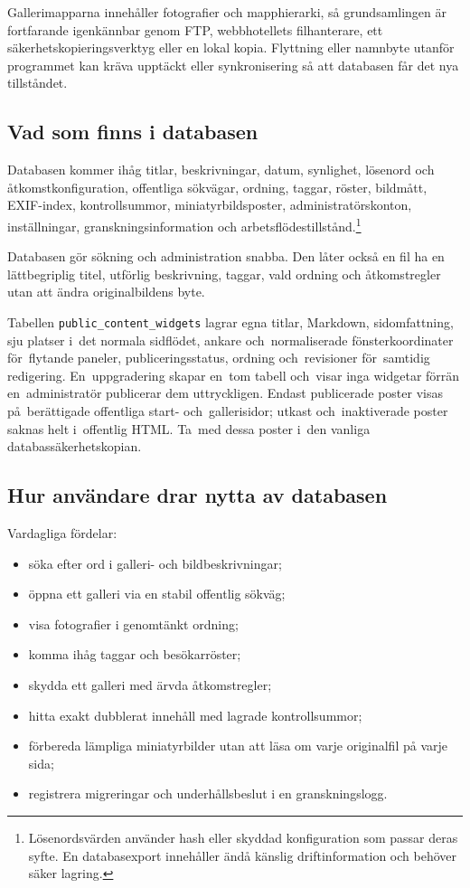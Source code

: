 \documentclass[11pt,a4paper]{article}
\begin{document}
Gallerimapparna innehåller fotografier och mapphierarki, så grundsamlingen är
fortfarande igenkännbar genom FTP, webbhotellets filhanterare, ett
säkerhetskopieringsverktyg eller en lokal kopia. Flyttning eller namnbyte
utanför programmet kan kräva upptäckt eller synkronisering så att databasen får
det nya tillståndet.

\subsection{Vad som finns i databasen}

Databasen kommer ihåg titlar, beskrivningar, datum, synlighet, lösenord och
åtkomstkonfiguration, offentliga sökvägar, ordning, taggar, röster, bildmått,
EXIF-index, kontrollsummor, miniatyrbildsposter, administratörskonton,
inställningar, granskningsinformation och
arbetsflödestillstånd.\footnote{Lösenordsvärden använder hash eller skyddad
konfiguration som passar deras syfte. En databasexport innehåller ändå känslig
driftinformation och behöver säker lagring.}

Databasen gör sökning och administration snabba. Den låter också en fil ha en
lättbegriplig titel, utförlig beskrivning, taggar, vald ordning och
åtkomstregler utan att ändra originalbildens byte.

Tabellen \texttt{public\_content\_widgets} lagrar egna titlar, Markdown,
sidomfattning, sju platser i~det normala sidflödet, ankare och~normaliserade
fönsterkoordinater för~flytande paneler, publiceringsstatus, ordning
och~revisioner för~samtidig redigering. En~uppgradering skapar en~tom tabell
och~visar inga widgetar förrän en~administratör publicerar dem uttryckligen.
Endast publicerade poster visas på~berättigade offentliga start-
och~gallerisidor; utkast och~inaktiverade poster saknas helt i~offentlig HTML.
Ta~med dessa poster i~den vanliga databassäkerhetskopian.

\subsection{Hur användare drar nytta av databasen}

Vardagliga fördelar:

\begin{itemize}
  \item söka efter ord i galleri- och bildbeskrivningar;
  \item öppna ett galleri via en stabil offentlig sökväg;
  \item visa fotografier i genomtänkt ordning;
  \item komma ihåg taggar och besökarröster;
  \item skydda ett galleri med ärvda åtkomstregler;
  \item hitta exakt dubblerat innehåll med lagrade kontrollsummor;
  \item förbereda lämpliga miniatyrbilder utan att läsa om varje originalfil på
  varje sida;
  \item registrera migreringar och underhållsbeslut i en granskningslogg.
\end{itemize}
\end{document}
